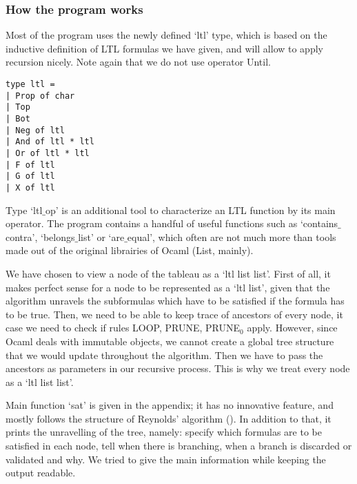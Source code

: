 \documentclass[11pt]{article}
\begin{document}
\subsubsection*{How the program works}

Most of the program uses the newly defined `ltl' type, which is based on the inductive 
definition of LTL formulas we have given, and will allow to apply recursion nicely.
Note again that we do not use operator Until.
\begin{lstlisting}
type ltl =
| Prop of char
| Top
| Bot
| Neg of ltl
| And of ltl * ltl
| Or of ltl * ltl
| F of ltl
| G of ltl
| X of ltl
\end{lstlisting}

Type `ltl$\_$op' is an additional tool to characterize an LTL function by its main operator.
The program contains a handful of useful functions such as `contains$\_$contra', `belongs$\_$list'
or `are$\_$equal', which often are not much more than tools made out of the original librairies
of Ocaml (List, mainly).

We have chosen to view a node of the tableau as a `ltl list list'.
First of all, it makes perfect sense for a
node to be represented as a `ltl list', given that the algorithm unravels the subformulas which 
have to be satisfied if the formula has to be true. Then, we need to be able to keep trace
of ancestors of every node, it case we need to check if rules LOOP, PRUNE, PRUNE$_0$ apply.
However, since Ocaml deals with immutable objects, we cannot create a global tree structure
that we would update throughout the algorithm. Then we have to pass the ancestors as parameters
in our recursive process. This is why we treat every node as a `ltl list list'.

Main function `sat' is given in the appendix; it has no innovative feature, and mostly
follows 
the structure of Reynolds' algorithm (\cite{ReyLTL}). In addition to that, it prints 
the unravelling of the tree, namely: specify which formulas are to be satisfied 
in each node, tell when there is branching, when a branch is discarded or validated and why.
We tried to give the main information while keeping the output readable.
\end{document}
